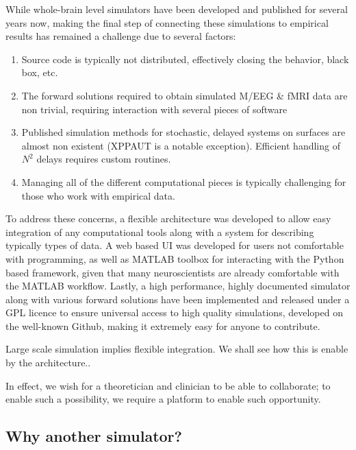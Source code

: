 
While whole-brain level simulators have been developed and published for
several years now, making the final step of connecting these simulations to
empirical results has remained a challenge due to several factors:

\begin{enumerate}

	\item Source code is typically not distributed, effectively closing
	the behavior, black box, etc. 

	\item The forward solutions required to obtain simulated M/EEG \& fMRI
	data are non trivial, requiring interaction with several pieces of software

	\item Published simulation methods for stochastic, delayed systems on
		surfaces are almost non existent (XPPAUT is a notable exception).
		Efficient handling of $N^2$ delays requires custom routines.

	\item Managing all of the different computational pieces is typically
	challenging for those who work with empirical data.

\end{enumerate}

To address these concerns, a flexible architecture was developed to
allow easy integration of any computational tools along with a system
for describing typically types of data. A web based UI was developed
for users not comfortable with programming, as well as MATLAB toolbox
for interacting with the Python based framework, given that many
neuroscientists are already comfortable with the MATLAB workflow.
Lastly, a high performance, highly documented simulator along with
various forward solutions have been implemented and released under a
GPL licence to ensure universal access to high quality simulations, 
developed on the well-known Github, making it extremely easy for 
anyone to contribute.


Large scale simulation implies flexible integration. We shall see
how this is enable by the architecture..

In effect, we wish for a theoretician and clinician to be able to
collaborate; to enable such a possibility, we require a platform
to enable such opportunity. 


\subsection{Why another simulator?}

